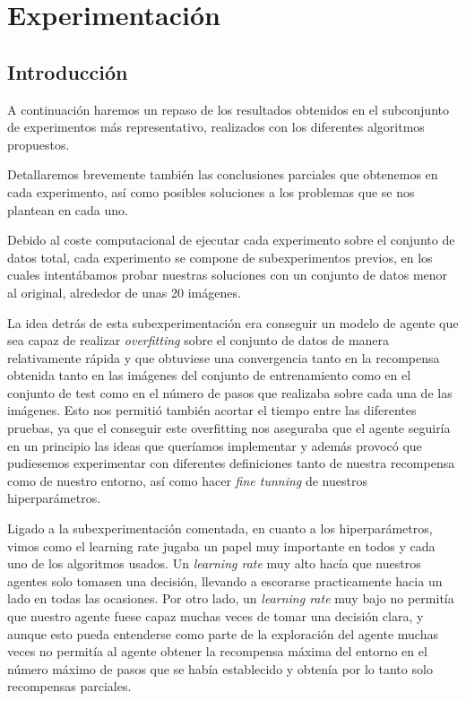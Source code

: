 
\cleardoublepage

\chapter{Experimentación}
\label{experimentacion}

\section{Introducción}
\label{resultados-introduccion}

A continuación haremos un repaso de los resultados obtenidos en el subconjunto de experimentos más representativo, realizados con los diferentes algoritmos propuestos.
\medskip

Detallaremos brevemente también las conclusiones parciales que obtenemos en cada experimento, así como posibles soluciones a los problemas que se nos plantean en cada uno.
\medskip

Debido al coste computacional de ejecutar cada experimento sobre el conjunto de datos total, cada experimento se compone de subexperimentos previos, en los cuales intentábamos probar nuestras soluciones con un conjunto de datos menor al original, alrededor de unas 20 imágenes. 
\medskip

La idea detrás de esta subexperimentación era conseguir un modelo de agente que sea capaz de realizar \textit{overfitting} sobre el conjunto de datos de manera relativamente rápida y que obtuviese una convergencia tanto en la recompensa obtenida tanto en las imágenes del conjunto de entrenamiento como en el conjunto de test como en el número de pasos que realizaba sobre cada una de las imágenes. Esto nos permitió también acortar el tiempo entre las diferentes pruebas, ya que el conseguir este overfitting nos aseguraba que el agente seguiría en un principio las ideas que queríamos implementar y además provocó que pudiesemos experimentar con diferentes definiciones tanto de nuestra recompensa como de nuestro entorno, así como hacer \textit{fine tunning} de nuestros hiperparámetros.
\medskip

Ligado a la subexperimentación comentada, en cuanto a los hiperparámetros, vimos como el learning rate jugaba un papel muy importante en todos y cada uno de los algoritmos usados. Un \textit{learning rate} muy alto hacía que nuestros agentes solo tomasen una decisión, llevando a escorarse practicamente hacia un lado en todas las ocasiones. Por otro lado, un \textit{learning rate} muy bajo no permitía que nuestro agente fuese capaz muchas veces de tomar una decisión clara, y aunque esto pueda entenderse como parte de la exploración del agente muchas veces no permitía al agente obtener la recompensa máxima del entorno en el número máximo de pasos que se había establecido y obtenía por lo tanto solo recompensas parciales.
\medskip

